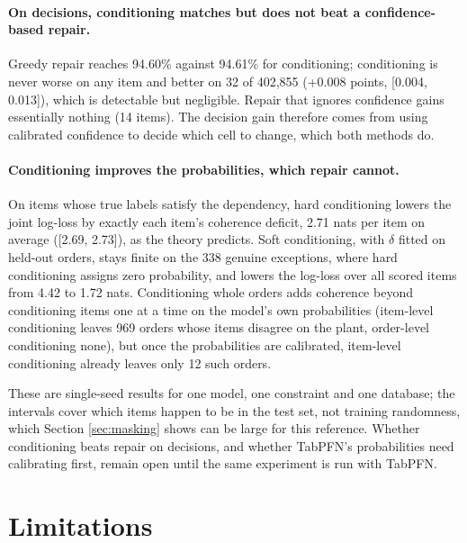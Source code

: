 \documentclass[11pt]{article}
\begin{document}
\paragraph{On decisions, conditioning matches but does not beat a confidence-based repair.}
Greedy repair reaches 94.60\% against 94.61\% for conditioning; conditioning is never worse on any
item and better on 32 of 402{,}855 (+0.008 points, [0.004, 0.013]), which is detectable but
negligible. Repair that ignores confidence gains essentially nothing (14 items). The decision
gain therefore comes from using calibrated confidence to decide which cell to change, which both
methods do.

\paragraph{Conditioning improves the probabilities, which repair cannot.} On items whose true
labels satisfy the dependency, hard conditioning lowers the joint log-loss by exactly each item's
coherence deficit, 2.71 nats per item on average ([2.69, 2.73]), as the theory predicts. Soft
conditioning, with $\delta$ fitted on held-out orders, stays finite on the 338 genuine exceptions,
where hard conditioning assigns zero probability, and lowers the log-loss over all scored items
from 4.42 to 1.72 nats. Conditioning whole orders adds coherence beyond conditioning items one at
a time on the model's own probabilities (item-level conditioning leaves 969 orders whose items
disagree on the plant, order-level conditioning none), but once the probabilities are calibrated,
item-level conditioning already leaves only 12 such orders.

These are single-seed results for one model, one constraint and one database; the intervals
cover which items happen to be in the test set, not training randomness, which Section
\ref{sec:masking} shows can be large for this reference. Whether conditioning beats repair on
decisions, and whether TabPFN's probabilities need calibrating first, remain open until the same
experiment is run with TabPFN.

\section{Limitations}
\label{sec:limitations}
\end{document}
